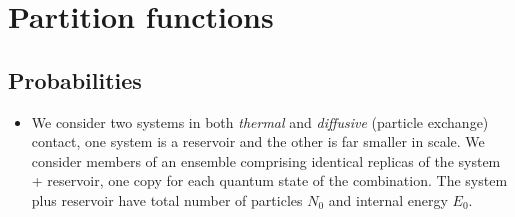 \documentclass[11pt]{article}
\numberwithin{equation}{section}
\begin{document}
\section{Partition functions }
\subsection{Probabilities }
\begin{itemize}
    \item We consider two systems in both \textit{thermal} and \textit{diffusive} (particle exchange) contact, one system is a reservoir and the other is far smaller in scale. We consider members of an ensemble comprising identical replicas of the system + reservoir, one copy for each quantum state of the combination. The system plus reservoir have total number of particles $N_0$ and internal energy $E_0$.  


\end{itemize}
\end{document}
